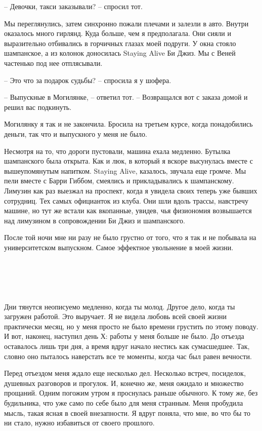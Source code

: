 \documentclass[
]{book}
\begin{document}
-- Девочки, такси заказывали? -- спросил тот.

Мы переглянулись, затем синхронно пожали плечами и залезли в авто. Внутри оказалось много гирлянд. Куда больше, чем я предполагала. Они сияли и выразительно отбивались в горчичных глазах моей подруги. У окна стояло шампанское, а из колонок доносилась Staying Alive Би Джиз. Мы с Веней частенько под нее отплясывали.

-- Это что за подарок судьбы? -- спросила я у шофера.

-- Выпускные в Могилянке, -- ответил тот. -- Возвращался вот с заказа домой и решил вас подкинуть.

Могилянку я так и не закончила. Бросила на третьем курсе, когда понадобились деньги, так что и выпускного у меня не было.

Несмотря на то, что дороги пустовали, машина ехала медленно. Бутылка шампанского была открыта. Как и люк, в который я вскоре высунулась вместе с вышеупомянутым напитком. Staying Alive, казалось, звучала еще громче. Мы пели вместе с Барри Гиббом, смеялись и прикладывались к шампанскому. Лимузин как раз выезжал на проспект, когда я увидела своих теперь уже бывших сотрудниц. Тех самых официанток из клуба. Они шли вдоль трассы, навстречу машине, но тут же встали как вкопанные, увидев, чья физиономия возвышается над лимузином в сопровождении Би Джиз и шампанского.

После той ночи мне ни разу не было грустно от того, что я так и не побывала на университетском выпускном. Самое эффектное увольнение в моей жизни.

\hypertarget{chapter-45}{%
\chapter{~}\label{chapter-45}}

Дни тянутся неописуемо медленно, когда ты молод. Другое дело, когда ты загружен работой. Это выручает. Я не видела любовь всей своей жизни практически месяц, но у меня просто не было времени грустить по этому поводу. И вот, наконец, наступил день Х: работы у меня больше не было. До отъезда оставалось лишь три дня, а время вдруг начало нестись как сумасшедшее. Так, словно оно пыталось наверстать все те моменты, когда час был равен вечности.

Перед отъездом меня ждало еще несколько дел. Несколько встреч, посиделок, душевных разговоров и прогулок. И, конечно же, меня ожидало и множество прощаний. Одним погожим утром я проснулась раньше обычного. К тому же, без будильника, что уже само по себе было для меня странным. Меня пробудила мысль, такая ясная в своей внезапности. Я вдруг поняла, что мне, во что бы то ни стало, нужно избавиться от своего прошлого.
\end{document}
